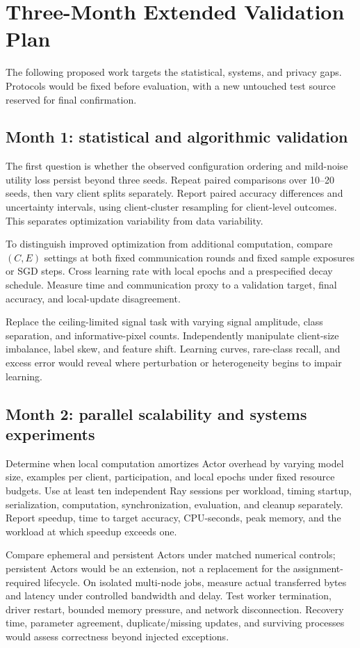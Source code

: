 \section{Three-Month Extended Validation Plan}\label{sec:plan}
The following proposed work targets the statistical, systems, and privacy gaps. Protocols would be fixed before evaluation, with a new untouched test source reserved for final confirmation.

\subsection{Month 1: statistical and algorithmic validation}
The first question is whether the observed configuration ordering and mild-noise utility loss persist beyond three seeds. Repeat paired comparisons over 10--20 seeds, then vary client splits separately. Report paired accuracy differences and uncertainty intervals, using client-cluster resampling for client-level outcomes. This separates optimization variability from data variability.

To distinguish improved optimization from additional computation, compare $(C,E)$ settings at both fixed communication rounds and fixed sample exposures or SGD steps. Cross learning rate with local epochs and a prespecified decay schedule. Measure time and communication proxy to a validation target, final accuracy, and local-update disagreement.

Replace the ceiling-limited signal task with varying signal amplitude, class separation, and informative-pixel counts. Independently manipulate client-size imbalance, label skew, and feature shift. Learning curves, rare-class recall, and excess error would reveal where perturbation or heterogeneity begins to impair learning.

\subsection{Month 2: parallel scalability and systems experiments}
Determine when local computation amortizes Actor overhead by varying model size, examples per client, participation, and local epochs under fixed resource budgets. Use at least ten independent Ray sessions per workload, timing startup, serialization, computation, synchronization, evaluation, and cleanup separately. Report speedup, time to target accuracy, CPU-seconds, peak memory, and the workload at which speedup exceeds one.

Compare ephemeral and persistent Actors under matched numerical controls; persistent Actors would be an extension, not a replacement for the assignment-required lifecycle. On isolated multi-node jobs, measure actual transferred bytes and latency under controlled bandwidth and delay. Test worker termination, driver restart, bounded memory pressure, and network disconnection. Recovery time, parameter agreement, duplicate/missing updates, and surviving processes would assess correctness beyond injected exceptions.

